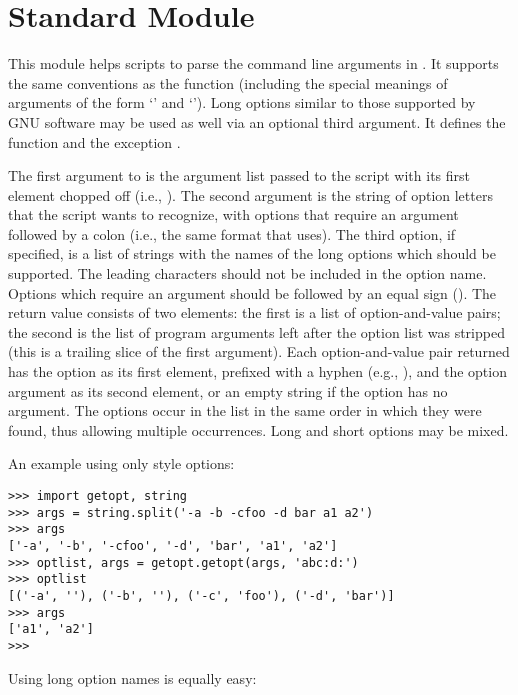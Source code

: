 \section{Standard Module }
\label{module-getopt}

This module helps scripts to parse the command line arguments in
.
It supports the same conventions as the \UNIX{}
function (including the special meanings of arguments of the form
`\code{-}' and `\code{-}\code{-}').
Long options similar to those supported by
GNU software may be used as well via an optional third argument.
It defines the function
and the exception
.

The first argument to
is the argument list passed to the script with its first element
chopped off (i.e.,
).
The second argument is the string of option letters that the
script wants to recognize, with options that require an argument
followed by a colon (i.e., the same format that \UNIX{}
uses).
The third option, if specified, is a list of strings with the names of
the long options which should be supported.  The leading 
characters should not be included in the option name.  Options which
require an argument should be followed by an equal sign ().
The return value consists of two elements: the first is a list of
option-and-value pairs; the second is the list of program arguments
left after the option list was stripped (this is a trailing slice of the
first argument).
Each option-and-value pair returned has the option as its first element,
prefixed with a hyphen (e.g.,
),
and the option argument as its second element, or an empty string if the
option has no argument.
The options occur in the list in the same order in which they were
found, thus allowing multiple occurrences.  Long and short options may
be mixed.

An example using only \UNIX{} style options:

\bcode\begin{verbatim}
>>> import getopt, string
>>> args = string.split('-a -b -cfoo -d bar a1 a2')
>>> args
['-a', '-b', '-cfoo', '-d', 'bar', 'a1', 'a2']
>>> optlist, args = getopt.getopt(args, 'abc:d:')
>>> optlist
[('-a', ''), ('-b', ''), ('-c', 'foo'), ('-d', 'bar')]
>>> args
['a1', 'a2']
>>> 
\end{verbatim}\ecode
%
Using long option names is equally easy:

